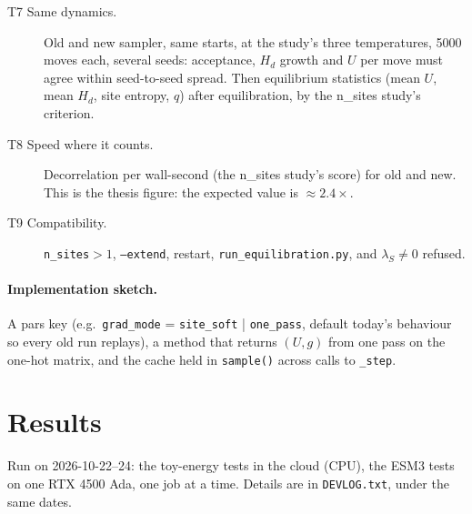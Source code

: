 \documentclass[11pt,a4paper]{article}
\newcommand{\file}[1]{\texttt{#1}}
\begin{document}
\begin{description}
  \item[T7 Same dynamics.] Old and new sampler, same starts, at the study's
        three temperatures, 5000 moves each, several seeds: acceptance, $H_d$
        growth and $U$ per move must agree within seed-to-seed spread. Then
        equilibrium statistics (mean $U$, mean $H_d$, site entropy, $q$) after
        equilibration, by the n\_sites study's criterion.
  \item[T8 Speed where it counts.] Decorrelation per wall-second (the n\_sites
        study's score) for old and new. This is the thesis figure: the
        expected value is $\approx2.4\times$.
  \item[T9 Compatibility.] \texttt{n\_sites}$>1$, \texttt{--extend}, restart,
        \texttt{run\_equilibration.py}, and $\lambda_S\ne0$ refused.
\end{description}

\paragraph{Implementation sketch.} A pars key (e.g.\ \texttt{grad\_mode} =
\texttt{site\_soft} | \texttt{one\_pass}, default today's behaviour so every
old run replays), a method that returns $(U,g)$ from one pass on the one-hot
matrix, and the cache held in \texttt{sample()} across calls to
\texttt{\_step}.


\section{Results}\label{sec:results}
Run on 2026-10-22--24: the toy-energy tests in the cloud (CPU), the ESM3 tests
on one RTX 4500 Ada, one job at a time. Details are in \file{DEVLOG.txt}, under
the same dates.
\end{document}
